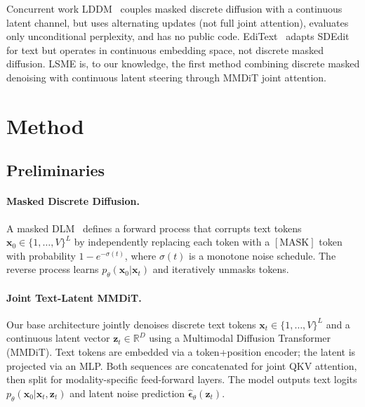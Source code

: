 \documentclass{article}
\begin{document}
Concurrent work LDDM~\citep{lddm2025} couples masked discrete diffusion with a continuous latent channel, but uses alternating updates (not full joint attention), evaluates only unconditional perplexity, and has no public code.
EdiText~\citep{editext2025} adapts SDEdit for text but operates in continuous embedding space, not discrete masked diffusion.
LSME is, to our knowledge, the first method combining discrete masked denoising with continuous latent steering through MMDiT joint attention.

\section{Method}
\label{sec:method}

\subsection{Preliminaries}

\paragraph{Masked Discrete Diffusion.}
A masked DLM~\citep{sahoo2024} defines a forward process that corrupts text tokens $\mathbf{x}_0 \in \{1, \ldots, V\}^L$ by independently replacing each token with a $[\text{MASK}]$ token with probability $1 - e^{-\sigma(t)}$, where $\sigma(t)$ is a monotone noise schedule.
The reverse process learns $p_\theta(\mathbf{x}_0 | \mathbf{x}_t)$ and iteratively unmasks tokens.

\paragraph{Joint Text-Latent MMDiT.}
Our base architecture jointly denoises discrete text tokens $\mathbf{x}_t \in \{1, \ldots, V\}^L$ and a continuous latent vector $\mathbf{z}_t \in \mathbb{R}^D$ using a Multimodal Diffusion Transformer (MMDiT).
Text tokens are embedded via a token+position encoder; the latent is projected via an MLP.
Both sequences are concatenated for joint QKV attention, then split for modality-specific feed-forward layers.
The model outputs text logits $p_\theta(\mathbf{x}_0 | \mathbf{x}_t, \mathbf{z}_t)$ and latent noise prediction $\hat{\boldsymbol{\epsilon}}_\theta(\mathbf{z}_t)$.
\end{document}
